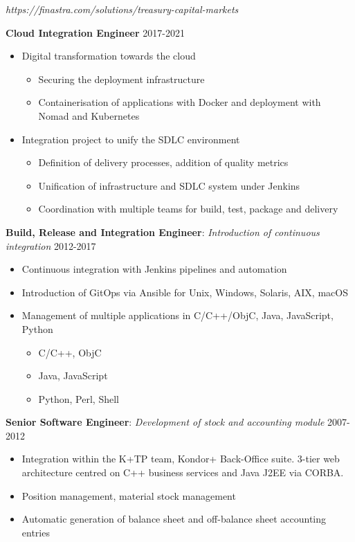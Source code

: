 \documentclass[11pt,a4paper]{moderncv}
\begin{document}
{
\textit{https://finastra.com/solutions/treasury-capital-markets}
\bigskip

\textbf{Cloud Integration Engineer} \hfill 2017-2021
\bigskip
	\begin{itemize}%
		\item Digital transformation towards the cloud
			\begin{itemize}%
				\item Securing the deployment infrastructure
				\item Containerisation of applications with Docker and deployment with Nomad and Kubernetes
			\end{itemize}
	\end{itemize}
\bigskip
	\begin{itemize}%
	\item	Integration project to unify the SDLC environment
		\begin{itemize}%
				\item Definition of delivery processes, addition of quality metrics
				\item Unification of infrastructure and SDLC system under Jenkins
				\item Coordination with multiple teams for build, test, package and delivery
		\end{itemize}
	\end{itemize}
\bigskip
 \textbf{Build, Release and Integration Engineer}: \textit{Introduction of continuous integration} \hfill 2012-2017
\bigskip
			\begin{itemize}%
				\item Continuous integration with Jenkins pipelines and automation
                \item Introduction of GitOps via Ansible for Unix, Windows, Solaris, AIX, macOS
				\item Management of multiple applications in C/C++/ObjC, Java, JavaScript, Python
					\begin{itemize}
						\item C/C++, ObjC
						\item Java, JavaScript
						\item Python, Perl, Shell
					\end{itemize}
				\end{itemize}
\bigskip
\textbf{Senior Software Engineer}: \textit{Development of stock and accounting module} \hfill 2007-2012

\bigskip
			\begin{itemize}
				\item Integration within the K+TP team, Kondor+ Back-Office suite. 3-tier web architecture centred on C++ business services and Java J2EE via CORBA.
				\item Position management, material stock management
				\item Automatic generation of balance sheet and off-balance sheet accounting entries
			\end{itemize}
}
\end{document}
